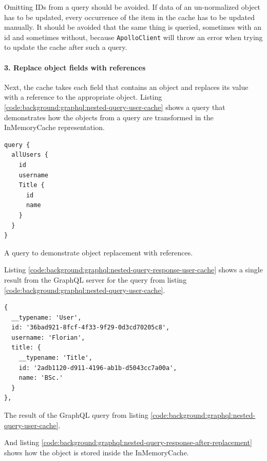 \noindent Omitting IDs from a query should be avoided. If data of an un-normalized object has to be updated, every occurrence of the item in the cache has to be updated manually. It should be avoided that the same thing is queried, sometimes with an id and sometimes without, because \texttt{ApolloClient} will throw an error when trying to update the cache after such a query.

\paragraph{3. Replace object fields with references}\label{paragraph:background:graphql:apollo-server-client:data-normalization:replace-object-fields-with-references}

Next, the cache takes each field that contains an object and replaces its value with a reference to the appropriate object. Listing \ref{code:background:graphql:nested-query-user-cache} shows a query that demonstrates how the objects from a query are transformed in the InMemoryCache representation.

\ifshowListings
\begin{listing}[H]
    \begin{verbatim}
query {
  allUsers {
    id
    username
    Title {
      id
      name
    }
  }
}
    \end{verbatim}
    \caption{A query to demonstrate object replacement with references.}\label{code:background:graphql:nested-query-user-cache}
\end{listing}
\fi

Listing \ref{code:background:graphql:nested-query-response-user-cache} shows a single result from the GraphQL server for the query from listing \ref{code:background:graphql:nested-query-user-cache}.

\ifshowListings
\begin{listing}[H]
    \begin{verbatim}
{
  __typename: 'User',
  id: '36bad921-8fcf-4f33-9f29-0d3cd70205c8',
  username: 'Florian',
  title: {
    __typename: 'Title',
    id: '2adb1120-d911-4196-ab1b-d5043cc7a00a',
    name: 'BSc.'
  }
},
    \end{verbatim}
    \caption{The result of the GraphQL query from listing \ref{code:background:graphql:nested-query-user-cache}.} \label{code:background:graphql:nested-query-response-user-cache}
\end{listing}
\fi

And listing \ref{code:background:graphql:nested-query-response-after-replacement} shows how the object is stored inside the InMemoryCache.

